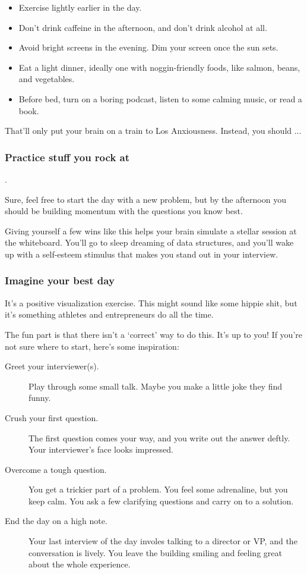 \documentclass{article}
\begin{document}
\begin{itemize}
\item Exercise lightly earlier in the day.
\item Don't drink caffeine in the afternoon, and don't drink alcohol at all.
\item Avoid bright screens in the evening. Dim your screen once the sun sets.
\item Eat a light dinner, ideally one with noggin-friendly foods, like salmon, beans, and vegetables.
\item Before bed, turn on a boring podcast, listen to some calming music, or read a book.


\end{itemize}


 That'll only put your brain on a train to Los Anxiousness.
Instead, you should ...

\subsubsection{Practice stuff you rock at}.

 Sure, feel free to start the day with a new problem, but by the afternoon you should be building momentum with the questions you know best.

Giving yourself a few wins like this helps your brain simulate a stellar session at the whiteboard. You'll go to sleep dreaming of data structures, and you'll wake up with a self-esteem stimulus that makes you stand out in your interview.


\subsubsection{Imagine your best day}

 It's a positive visualization exercise. This might sound like some hippie shit, but it's something athletes and entrepreneurs do all the time.

The fun part is that there isn't a ‘correct’ way to do this. It's up to you! If you're not sure where to start, here's some inspiration:
\begin{description}
\item[Greet your interviewer(s).] Play through some small talk. Maybe you make a little joke they find funny.
\item[Crush your first question.] The first question comes your way, and you write out the answer deftly. Your interviewer's face looks impressed.
\item[Overcome a tough question.] You get a trickier part of a problem. You feel some adrenaline, but you keep calm. You ask a few clarifying questions and carry on to a solution.
\item[End the day on a high note.] Your last interview of the day involes talking to a director or VP, and the conversation is lively. You leave the building smiling and feeling great about the whole experience.
\end{description}
\end{document}
